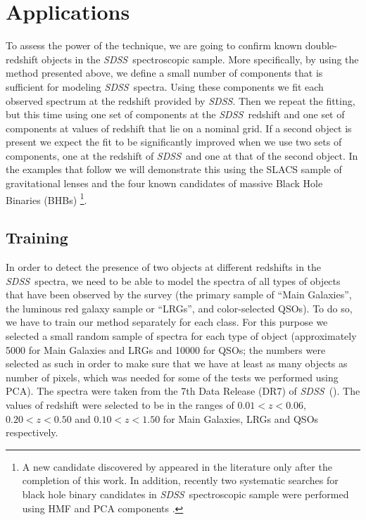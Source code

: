 \documentclass[12pt,preprint]{aastex}
\newcommand{\project}[1]{\textsl{#1}}
\newcommand{\sdss}{\project{SDSS}}
\newcommand{\SDSS}{\sdss}
\begin{document}
\section{Applications}\label{sec:applications}
To assess the power of the technique, we are going to confirm known
double-redshift objects in the \SDSS\ spectroscopic sample. More
specifically, by using the method presented above, we define a small
number of components that is sufficient for modeling \SDSS\ 
spectra. Using these components we fit each observed spectrum at the
redshift provided by \SDSS. Then we repeat the fitting, but this time
using one set of components at the \SDSS\ redshift and one set of
components at values of redshift that lie on a nominal grid. If a
second object is present we expect the fit to be significantly improved when we use
two sets of components, one at the redshift of \SDSS\ and one at that of
the second object. In the examples that follow we will demonstrate
this using the SLACS sample of gravitational lenses \citep{bolton} and
the four known candidates of massive Black Hole Binaries (BHBs)
\citep{komossa,bogdanovic09,dotti09,boroson,shields,decarli}
\footnote{A new candidate discovered by \cite{barrows11} appeared in the literature 
only after the completion of this work. In addition, recently two systematic searches 
for black hole binary candidates in \SDSS\ spectroscopic sample were performed using HMF 
\citep{tsalmantza} and PCA components \citep{eracleous}.}.

\subsection{Training}\label{sec:training}
In order to detect the presence of two objects at different redshifts
in the \SDSS\ spectra, we need to be able to model the spectra of all
types of objects that have been observed by the survey (the primary
sample of ``Main Galaxies'', the luminous red galaxy sample or
``LRGs'', and color-selected QSOs). To do so, we have to train our
method separately for each class. For this purpose we selected a small
random sample of spectra for each type of object (approximately 5000
for Main Galaxies and LRGs and 10000 for QSOs; the numbers were
selected as such in order to make sure that we have at least as many
objects as number of pixels, which was needed for some of the tests we
performed using PCA). The spectra were taken from the 7th Data Release
(DR7) of \SDSS\ (\citealt{sdssdr7}). The values of redshift were selected to
be in the ranges of $0.01<z<0.06$, $0.20<z<0.50$ and $0.10<z<1.50$ for
Main Galaxies, LRGs and QSOs respectively.
\end{document}
